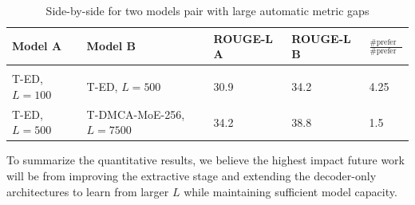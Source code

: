 {\begin{table}[t]
\caption{Side-by-side for two models pair with large automatic metric gaps }
\label{human_eval_table}
\begin{center}
\begin{tabular}{lllll}
\multicolumn{1}{l}{\bf Model A} &\multicolumn{1}{l}{\bf Model B}
                                &\multicolumn{1}{l}{\bf ROUGE-L A}
                                &\multicolumn{1}{l}{\bf ROUGE-L B}
                                &\multicolumn{1}{l}{\bf $\frac{\textrm{\#  prefer B}}{\textrm{\# prefer A}}$}
\\ \hline \\
T-ED, $L=100$ & T-ED, $L=500$ &  30.9 & 34.2  & 4.25 \\
T-ED, $L=500$ & T-DMCA-MoE-256, $L=7500$ & 34.2 & 38.8  & 1.5 \\
\end{tabular}
\end{center}
\end{table}

To summarize the quantitative results, we believe the highest impact future work
will be from improving the extractive stage
and extending the decoder-only architectures to learn from larger $L$ while maintaining sufficient
model capacity.

}
